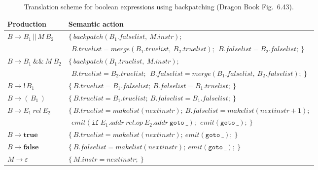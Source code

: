 \documentclass[11pt,a4paper]{article}
\newcommand{\at}[2]{\ensuremath{#1.\mathit{#2}}}
\newcommand{\tok}[1]{\ensuremath{\mathtt{#1}}}
\begin{document}
\begin{table}[htbp]
\centering
\small
\begin{tabular}{@{}L{3.3cm} L{11.3cm}@{}}
\toprule
\textbf{Production} & \textbf{Semantic action} \\ \midrule
$B \to B_1 \,|\!|\, M\ B_2$ &
$\{\ \mathit{backpatch}(\at{B_1}{falselist},\ \at{M}{instr});$\\
& $\ \ \at{B}{truelist}=\mathit{merge}(\at{B_1}{truelist},\ \at{B_2}{truelist});\ \ \at{B}{falselist}=\at{B_2}{falselist};\ \}$ \\[3pt]
$B \to B_1\ \&\&\ M\ B_2$ &
$\{\ \mathit{backpatch}(\at{B_1}{truelist},\ \at{M}{instr});$\\
& $\ \ \at{B}{truelist}=\at{B_2}{truelist};\ \ \at{B}{falselist}=\mathit{merge}(\at{B_1}{falselist},\ \at{B_2}{falselist});\ \}$ \\[3pt]
$B \to !\,B_1$ &
$\{\ \at{B}{truelist}=\at{B_1}{falselist};\ \at{B}{falselist}=\at{B_1}{truelist};\ \}$ \\[3pt]
$B \to (\,B_1\,)$ &
$\{\ \at{B}{truelist}=\at{B_1}{truelist};\ \at{B}{falselist}=\at{B_1}{falselist};\ \}$ \\[3pt]
$B \to E_1\ \mathit{rel}\ E_2$ &
$\{\ \at{B}{truelist}=\mathit{makelist}(\mathit{nextinstr});\ \at{B}{falselist}=\mathit{makelist}(\mathit{nextinstr}+1);$\\
& $\ \ \mathit{emit}(\tok{if}\ \at{E_1}{addr}\ \mathit{rel.op}\ \at{E_2}{addr}\ \tok{goto}\ \_);\ \ \mathit{emit}(\tok{goto}\ \_);\ \}$ \\[3pt]
$B \to \mathbf{true}$ &
$\{\ \at{B}{truelist}=\mathit{makelist}(\mathit{nextinstr});\ \mathit{emit}(\tok{goto}\ \_);\ \}$ \\[3pt]
$B \to \mathbf{false}$ &
$\{\ \at{B}{falselist}=\mathit{makelist}(\mathit{nextinstr});\ \mathit{emit}(\tok{goto}\ \_);\ \}$ \\[3pt]
$M \to \varepsilon$ &
$\{\ \at{M}{instr}=\mathit{nextinstr};\ \}$ \\ \bottomrule
\end{tabular}
\caption{Translation scheme for boolean expressions using backpatching (Dragon Book Fig.~6.43).}
\end{table}
\end{document}
